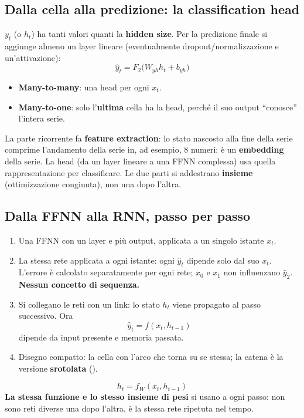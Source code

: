 \subsection{Dalla cella alla predizione: la classification head}
$y_t$ (o $h_t$) ha tanti valori quanti la \textbf{hidden size}. Per la predizione finale si aggiunge almeno un layer lineare
(eventualmente dropout/normalizzazione e un'attivazione):
\[
\hat y_t = F_2\big(W_{yh}h_t + b_{yh}\big)
\]
\begin{itemize}
  \item \textbf{Many-to-many}: una head per ogni $x_t$.
  \item \textbf{Many-to-one}: solo l'\textbf{ultima} cella ha la head, perché il suo output ``conosce'' l'intera serie.
\end{itemize}
\begin{esame}
La parte ricorrente fa \textbf{feature extraction}: lo stato nascosto alla fine della serie comprime l'andamento della serie in,
ad esempio, 8 numeri: è un \textbf{embedding} della serie. La head (da un layer lineare a una FFNN complessa) usa quella
rappresentazione per classificare. Le due parti si addestrano \textbf{insieme} (ottimizzazione congiunta), non una dopo l'altra.
\end{esame}

\subsection{Dalla FFNN alla RNN, passo per passo}
\begin{enumerate}
  \item Una FFNN con un layer e più output, applicata a un singolo istante $x_t$.
  \item La stessa rete applicata a ogni istante: ogni $\hat y_t$ dipende solo dal suo $x_t$. L'errore è calcolato separatamente per ogni
        rete; $x_0$ e $x_1$ non influenzano $\hat y_2$. \textbf{Nessun concetto di sequenza.}
  \item Si collegano le reti con un link: lo stato $h_t$ viene propagato al passo successivo. Ora
        \[\hat y_t = f(x_t, h_{t-1})\]
        dipende da input presente e memoria passata.
  \item Disegno compatto: la cella con l'arco che torna su se stessa; la catena è la versione \textbf{srotolata} ().
\end{enumerate}
\begin{definizione}
\[ h_t = f_W(x_t, h_{t-1}) \]
\textbf{La stessa funzione e lo stesso insieme di pesi} si usano a ogni passo: non sono reti diverse una dopo l'altra, è la stessa
rete ripetuta nel tempo.
\end{definizione}

